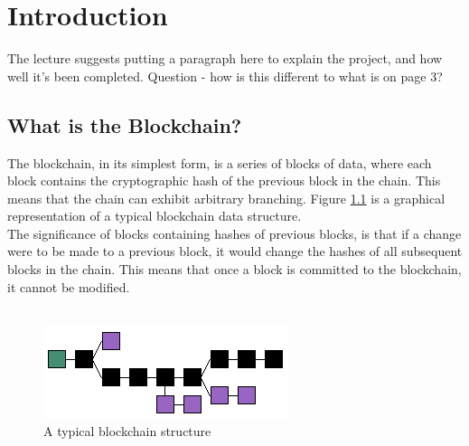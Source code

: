 \documentclass[12pt,a4paper,twoside,openright]{report}
\begin{document}
	
	\pagestyle{headings}
	
	\chapter{Introduction}
	
	The lecture suggests putting a paragraph here to explain the project, and how well it's been completed. Question - how is this different to what is on page 3?

	\section{What is the Blockchain?}
	
	The blockchain, in its simplest form, is a series of blocks of data, where each block contains the cryptographic hash of the previous block in the chain. This means that the chain can exhibit arbitrary branching. Figure \ref{fig:mainblockchain} is a graphical representation of a typical blockchain data structure.\\
	The significance of blocks containing hashes of previous blocks, is that if a change were to be made to a previous block, it would change the hashes of all subsequent blocks in the chain. This means that once a block is committed to the blockchain, it cannot be modified. \\
	\\
	\begin{figure}
		\includegraphics[width=\linewidth]{figs/blockchain}
		\caption{A typical blockchain structure}
		\label{fig:mainblockchain}
	\end{figure}
	
\end{document}
